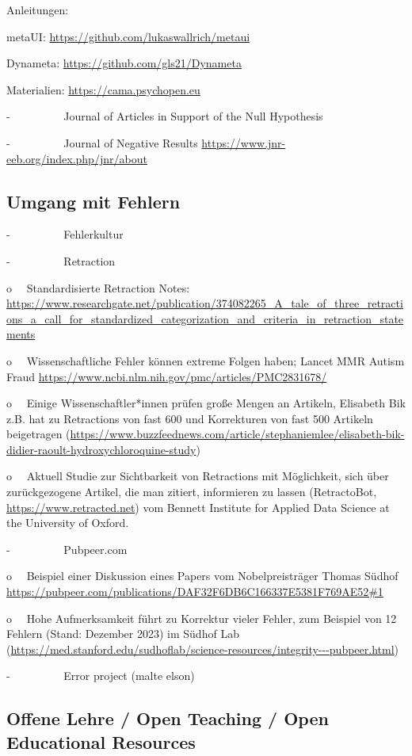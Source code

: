 \documentclass[
  letterpaper,
  DIV=11,
  numbers=noendperiod]{scrreprt}
\begin{document}
Anleitungen:

metaUI: \url{https://github.com/lukaswallrich/metaui}

Dynameta: \url{https://github.com/gls21/Dynameta}

Materialien: \url{https://cama.psychopen.eu}

-~~~~~~~~~ Journal of Articles in Support of the Null Hypothesis

-~~~~~~~~~ Journal of Negative Results
\url{https://www.jnr-eeb.org/index.php/jnr/about}

\subsection{Umgang mit Fehlern}\label{umgang-mit-fehlern}

-~~~~~~~~~ Fehlerkultur

-~~~~~~~~~ Retraction

o~~ Standardisierte Retraction Notes:
\url{https://www.researchgate.net/publication/374082265_A_tale_of_three_retractions_a_call_for_standardized_categorization_and_criteria_in_retraction_statements}

o~~ Wissenschaftliche Fehler können extreme Folgen haben; Lancet MMR
Autism Fraud \url{https://www.ncbi.nlm.nih.gov/pmc/articles/PMC2831678/}

o~~ Einige Wissenschaftler*innen prüfen große Mengen an Artikeln,
Elisabeth Bik z.B. hat zu Retractions von fast 600 und Korrekturen von
fast 500 Artikeln beigetragen
(\url{https://www.buzzfeednews.com/article/stephaniemlee/elisabeth-bik-didier-raoult-hydroxychloroquine-study})

o~~ Aktuell Studie zur Sichtbarkeit von Retractions mit Möglichkeit,
sich über zurückgezogene Artikel, die man zitiert, informieren zu lassen
(RetractoBot, \url{https://www.retracted.net}) vom Bennett Institute for
Applied Data Science at the University of Oxford.

-~~~~~~~~~ Pubpeer.com

o~~ Beispiel einer Diskussion eines Papers vom Nobelpreisträger Thomas
Südhof
\url{https://pubpeer.com/publications/DAF32F6DB6C166337E5381F769AE52\#1}

o~~ Hohe Aufmerksamkeit führt zu Korrektur vieler Fehler, zum Beispiel
von 12 Fehlern (Stand: Dezember 2023) im Südhof Lab
(\url{https://med.stanford.edu/sudhoflab/science-resources/integrity---pubpeer.html})

-~~~~~~~~~ Error project (malte elson)

\subsection{Offene Lehre / Open Teaching / Open Educational
Resources}\label{offene-lehre-open-teaching-open-educational-resources}
\end{document}
